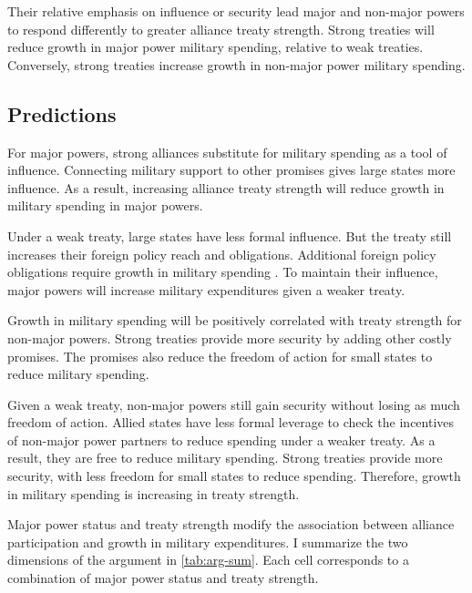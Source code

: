 \documentclass[12pt]{article}
\begin{document}
Their relative emphasis on influence or security lead major and non-major powers to respond differently to greater alliance treaty strength. 
Strong treaties will reduce growth in major power military spending, relative to weak treaties. 
Conversely, strong treaties increase growth in non-major power military spending. 

 


\subsection{Predictions} 

 
For major powers, strong alliances substitute for military spending as a tool of influence. 
Connecting military support to other promises gives large states more influence.
As a result, increasing alliance treaty strength will reduce growth in military spending in major powers. 


Under a weak treaty, large states have less formal influence. 
But the treaty still increases their foreign policy reach and obligations. 
Additional foreign policy obligations require growth in military spending \citep{Diehl1994}. 
To maintain their influence, major powers will increase military expenditures given a weaker treaty. 


Growth in military spending will be positively correlated with treaty strength for non-major powers. 
Strong treaties provide more security by adding other costly promises. 
The promises also reduce the freedom of action for small states to reduce military spending. 


Given a weak treaty, non-major powers still gain security without losing as much freedom of action. 
Allied states have less formal leverage to check the incentives of non-major power partners to reduce spending under a weaker treaty. 
As a result, they are free to reduce military spending. 
Strong treaties provide more security, with less freedom for small states to reduce spending. 
Therefore, growth in military spending is increasing in treaty strength. 


Major power status and treaty strength modify the association between alliance participation and growth in military expenditures. 
I summarize the two dimensions of the argument in \autoref{tab:arg-sum}. 
Each cell corresponds to a combination of major power status and treaty strength. 
\end{document}
